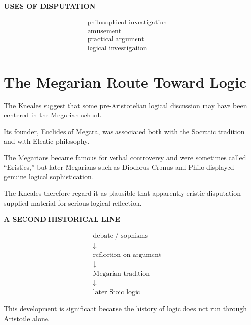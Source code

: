 \documentclass[11pt]{article}
\begin{document}
\begin{whiteboard}
\textbf{USES OF DISPUTATION}

\[
\begin{array}{l}
\text{philosophical investigation}\\
\text{amusement}\\
\text{practical argument}\\
\text{logical investigation}
\end{array}
\]
\end{whiteboard}

\section{The Megarian Route Toward Logic}

The Kneales suggest that some pre-Aristotelian logical discussion
may have been centered in the Megarian school.

Its founder, Euclides of Megara, was associated both with the
Socratic tradition and with Eleatic philosophy.

The Megarians became famous for verbal controversy and were
sometimes called ``Eristics,'' but later Megarians such as
Diodorus Cronus and Philo displayed genuine logical
sophistication.

The Kneales therefore regard it as plausible that apparently
eristic disputation supplied material for serious logical
reflection.

\newpage

\begin{whiteboard}
\textbf{A SECOND HISTORICAL LINE}

\[
\begin{array}{c}
\text{debate / sophisms}\\
\downarrow\\
\text{reflection on argument}\\
\downarrow\\
\text{Megarian tradition}\\
\downarrow\\
\text{later Stoic logic}
\end{array}
\]
\end{whiteboard}

This development is significant because the history of logic does
not run through Aristotle alone.

\end{document}
